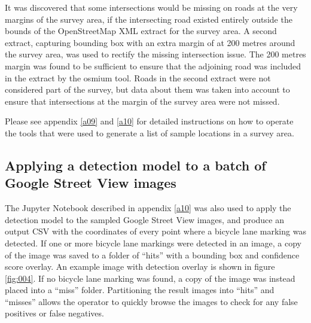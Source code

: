 \documentclass[11pt,twoside]{report}
\begin{document}
It was discovered that some intersections would be missing on roads at the very margins of the survey area, if the intersecting road existed entirely outside the bounds of the OpenStreetMap XML extract for the survey area.  A second extract, capturing bounding box with an extra margin of at 200 metres around the survey area, was used to rectify the missing intersection issue.  The 200 metres margin was found to be sufficient to ensure that the adjoining road was included in the extract by the osmium tool.  Roads in the second extract were not considered part of the survey, but data about them was taken into account to ensure that intersections at the margin of the survey area were not missed.

Please see appendix \ref{a09} and \ref{a10} for detailed instructions on how to operate the tools that were used to generate a list of sample locations in a survey area.


\subsection{Applying a detection model to a batch of Google Street View images}
\label{s:rq2b}

The Jupyter Notebook described in appendix \ref{a10} was also used to apply the detection model to the sampled Google Street View images, and produce an output CSV with the coordinates of every point where a bicycle lane marking was detected.  If one or more bicycle lane markings were detected in an image, a copy of the image was saved to a folder of ``hits'' with a bounding box and confidence score overlay.  An example image with detection overlay is shown in figure \ref{fig:004}.  If no bicycle lane marking was found, a copy of the image was instead placed into a ``miss'' folder.  Partitioning the result images into ``hits'' and ``misses'' allows the operator to quickly browse the images to check for any false positives or false negatives.
\end{document}
